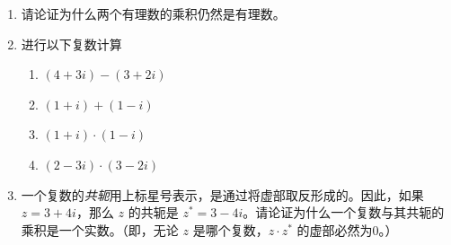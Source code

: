 \begin{enumerate}
  
  \vfill
  
  \item 
  
  请论证为什么两个有理数的乘积仍然是有理数。
  
  
  \vfill
  
  \textbookpagebreak
  
  \hintspagebreak
  
  \item 
  
    进行以下复数计算
  
    \begin{enumerate}
    \item \rule{0pt}{20pt}$ (4 + 3i) - (3 + 2i) $
    \item \rule{0pt}{20pt}$ (1 + i) + (1 - i) $
    \item \rule{0pt}{20pt}$ (1 + i) \cdot (1 - i) $
    \item \rule{0pt}{20pt}$ (2 - 3i) \cdot (3 - 2i) $
    \end{enumerate}
  
  
  \workbookpagebreak
  
  \item 
  
  一个复数的{\em 共轭}用上标星号表示，是通过将虚部取反形成的。因此，如果 $z = 3+ 4i$，那么 $z$ 的共轭是 $z^\ast = 3-4i$。请论证为什么一个复数与其共轭的乘积是一个实数。（即，无论 $z$ 是哪个复数，$z\cdot z^\ast$ 的虚部必然为0。）
  
  
  \vfill
  
  \workbookpagebreak
  
  \end{enumerate}
  
  
  
